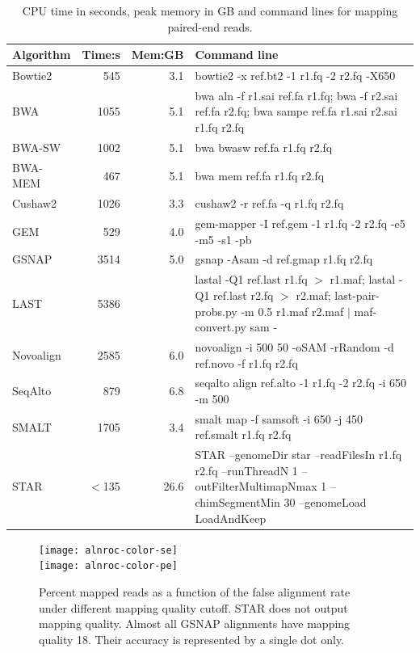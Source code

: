 \documentclass[10pt,pdftex]{article}
\begin{document}
\begin{table}[!tbhp]
\footnotesize
\centering
\begin{tabular}{lrrp{9cm}}
\hline
Algorithm & Time:s & Mem:GB & Command line \\
\hline
Bowtie2   & 545& 3.1& bowtie2 -x ref.bt2 -1 r1.fq -2 r2.fq -X650 \\
BWA       & 1055& 5.1 & bwa aln -f r1.sai ref.fa r1.fq; bwa -f r2.sai ref.fa r2.fq; bwa sampe ref.fa r1.sai r2.sai r1.fq r2.fq \\
BWA-SW    & 1002& 5.1 & bwa bwasw ref.fa r1.fq r2.fq \\
BWA-MEM   & 467 & 5.1 & bwa mem ref.fa r1.fq r2.fq \\
Cushaw2   & 1026& 3.3 & cushaw2 -r ref.fa -q r1.fq r2.fq \\
GEM       & 529 & 4.0 & gem-mapper -I ref.gem -1 r1.fq -2 r2.fq -e5 -m5 -s1 -pb \\
GSNAP     & 3514& 5.0 & gsnap -Asam -d ref.gmap r1.fq r2.fq \\
LAST      & 5386& & lastal -Q1 ref.last r1.fq $>$ r1.maf; lastal -Q1 ref.last r2.fq $>$ r2.maf; last-pair-probs.py -m 0.5 r1.maf r2.maf $|$ maf-convert.py sam - \\
Novoalign & 2585& 6.0 & novoalign -i 500 50 -oSAM -rRandom -d ref.novo -f r1.fq r2.fq \\
SeqAlto   & 879 & 6.8 & seqalto align ref.alto -1 r1.fq -2 r2.fq -i 650 -m 500 \\
SMALT     & 1705& 3.4 & smalt map -f samsoft -i 650 -j 450 ref.smalt r1.fq r2.fq \\
STAR      & $<$135& 26.6& STAR --genomeDir star --readFilesIn r1.fq r2.fq --runThreadN 1 --outFilterMultimapNmax 1 --chimSegmentMin 30 --genomeLoad LoadAndKeep \\
\hline
\end{tabular}
\caption{CPU time in seconds, peak memory in GB and command lines for mapping paired-end reads.}
\end{table}

\begin{figure}
\centering
\texttt{[image: alnroc-color-se]}\\
\texttt{[image: alnroc-color-pe]}
\caption{Percent mapped reads as a function of the false alignment rate under
different mapping quality cutoff. STAR does not output mapping quality. Almost
all GSNAP alignments have mapping quality 18. Their accuracy is represented by
a single dot only.}
\end{figure}

\pagebreak

\end{document}
